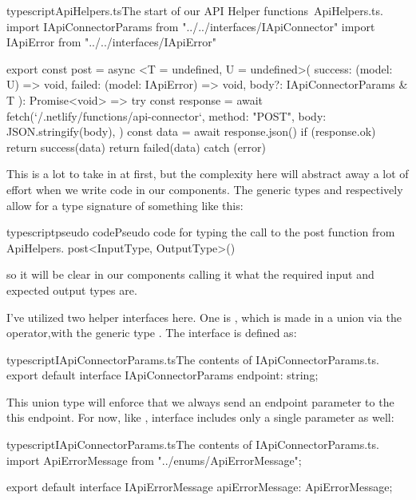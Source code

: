 \documentclass[paper=6in:9in,pagesize=pdftex,headinclude=on,footinclude=on,12pt,twoside]{scrbook}
\begin{document}
\begin{codeInput}{typescript}{ApiHelpers.ts}{The start of our API Helper functions\, ApiHelpers.ts.}
import IApiConnectorParams from "../../interfaces/IApiConnector"
import IApiError from "../../interfaces/IApiError"

export const post = async <T = undefined, U = undefined>(
  success: (model: U) => void,
  failed: (model: IApiError) => void,
  body?: IApiConnectorParams & T
): Promise<void> => {
  try {
    const response = await fetch(`/.netlify/functions/api-connector`, {
      method: "POST",
      body: JSON.stringify(body),
    })
    const data = await response.json()
    if (response.ok) {
      return success(data)
    }
    return failed(data)
  } catch (error) {}
}  
\end{codeInput}

This is a lot to take in at first, but the complexity here will abstract away a lot of effort when we write code in our components. The generic types  and  respectively allow for a  type signature of something like this: 

\begin{codeInput}{typescript}{pseudo code}{Pseudo code for typing the call to the post function from ApiHelpers.}
post<InputType, OutputType>()
\end{codeInput}

so it will be clear in our components calling it what the required input and expected output types are.

I've utilized two helper interfaces here. One is , which is made in a union via the \codeword{\&} operator,with the generic type . The  interface is defined as:

\begin{codeInput}{typescript}{IApiConnectorParams.ts}{The contents of IApiConnectorParams.ts.}
export default interface IApiConnectorParams {
  endpoint: string;
}
\end{codeInput}

This union type will enforce that we always send an endpoint parameter to the this endpoint. For now, like , interface  includes only a single parameter as well:

\begin{codeInput}{typescript}{IApiConnectorParams.ts}{The contents of IApiConnectorParams.ts.}
import ApiErrorMessage from "../enums/ApiErrorMessage";

export default interface IApiErrorMessage {
    apiErrorMessage: ApiErrorMessage;
}
\end{codeInput}
\end{document}
